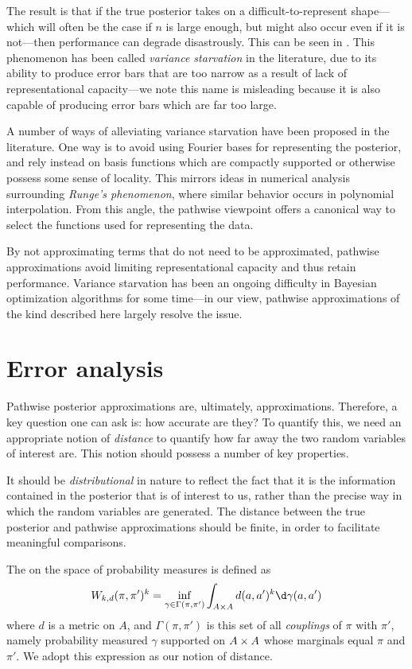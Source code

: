 \documentclass[11pt]{book}
\begin{document}
The result is that if the true posterior takes on a difficult-to-represent shape---which will often be the case if $n$ is large enough, but might also occur even if it is not---then performance can degrade disastrously.
This can be seen in .
This phenomenon has been called \emph{variance starvation} in the literature, due to its ability to produce error bars that are too narrow as a result of lack of representational capacity---we note this name is misleading because it is also capable of producing error bars which are far too large.

A number of ways of alleviating variance starvation have been proposed in the literature.
One way is to avoid using Fourier bases for representing the posterior, and rely instead on basis functions which are compactly supported or otherwise possess some sense of locality.
This mirrors ideas in numerical analysis surrounding \emph{Runge's phenomenon}, where similar behavior occurs in polynomial interpolation.
From this angle, the pathwise viewpoint offers a canonical way to select the functions used for representing the data.

By not approximating terms that do not need to be approximated, pathwise approximations avoid limiting representational capacity and thus retain performance.
Variance starvation has been an ongoing difficulty in Bayesian optimization algorithms for some time---in our view, pathwise approximations of the kind described here largely resolve the issue.


\section{Error analysis}

Pathwise posterior approximations are, ultimately, approximations.
Therefore, a key question one can ask is: how accurate are they?
To quantify this, we need an appropriate notion of \emph{distance} to quantify how far away the two random variables of interest are.
This notion should possess a number of key properties.

\1  It should be \emph{distributional} in nature to reflect the fact that it is the information contained in the posterior that is of interest to us, rather than the precise way in which the random variables are generated.
\2 The distance between the true posterior and pathwise approximations should be finite, in order to facilitate meaningful comparisons.
\0 

The  on the space of probability measures is defined as 
\[
W_{k,d}(\pi,\pi')^k = \inf_{\gamma\in\Gamma(\pi,\pi')} \int_{A\x A} d(a,a')^k \d\gamma(a,a')
\]
where $d$ is a metric on $A$, and $\Gamma(\pi,\pi')$ is this set of all \emph{couplings} of $\pi$ with $\pi'$, namely probability measured $\gamma$ supported on $A\times A$ whose marginals equal $\pi$ and $\pi'$.
We adopt this expression as our notion of distance.
\end{document}
